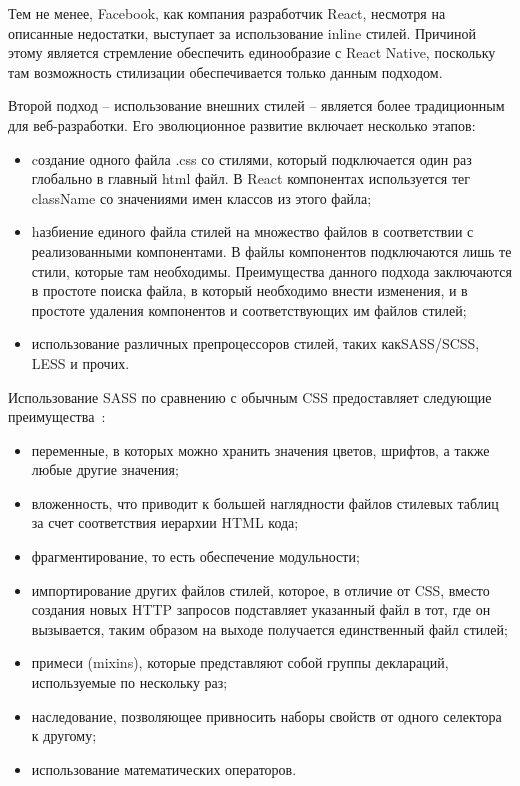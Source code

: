 Тем не менее, Facebook, как компания разработчик React, несмотря на описанные недостатки, выступает за использование
inline стилей. Причиной этому является стремление обеспечить единообразие с React Native, поскольку там возможность
стилизации обеспечивается только данным подходом.

Второй подход -- использование внешних стилей -- является более традиционным для веб-разработки. Его эволюционное
развитие включает несколько этапов:

\begin{itemize}
  \item cоздание одного файла .css со стилями, который подключается один раз глобально в главный html файл. В React
  компонентах используется тег className со значениями имен классов из этого файла;
  \item hазбиение единого файла стилей на множество файлов в соответствии с реализованными компонентами. В файлы
  компонентов подключаются лишь те стили, которые там необходимы. Преимущества данного подхода заключаются в простоте
  поиска файла, в который необходимо внести изменения, и в простоте удаления компонентов и соответствующих им файлов стилей;
	\item использование различных препроцессоров стилей, таких как\linebreak SASS/SCSS, LESS и прочих.
\end{itemize}

Использование SASS по сравнению с обычным CSS предоставляет следующие преимущества~\cite{sass_guide}:

\begin{itemize}
	\item переменные, в которых можно хранить значения цветов, шрифтов, а также любые другие значения;
	\item вложенность, что приводит к большей наглядности файлов стилевых таблиц за счет соответствия иерархии HTML кода;
	\item фрагментирование, то есть обеспечение модульности;
  \item импортирование других файлов стилей, которое, в отличие от CSS, вместо создания новых HTTP запросов подставляет
  указанный файл в тот, где он вызывается, таким образом на выходе получается единственный файл стилей;
	\item примеси (mixins), которые представляют собой группы деклараций, используемые по нескольку раз;
	\item наследование, позволяющее привносить наборы свойств от одного селектора к другому;
	\item использование математических операторов.
\end{itemize}

